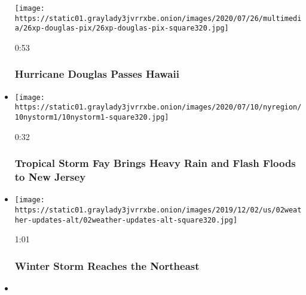 \begin{itemize}
  \texttt{[image: https://static01.graylady3jvrrxbe.onion/images/2020/07/26/multimedia/26xp-douglas-pix/26xp-douglas-pix-square320.jpg]}

  0:53

  \hypertarget{hurricane-douglas-passes-hawaii}{%
  \subsubsection{Hurricane Douglas Passes
  Hawaii}\label{hurricane-douglas-passes-hawaii}}
\item
  \href{https://www.nytimes3xbfgragh.onion/video/us/100000007233406/tropical-storm-fay-brings-heavy-rain-and-flash-floods-to-new-jersey.html?action=click\&module=video-series-bar\&region=header\&pgtype=Article\&playlistId=video/extreme-weather}{}

  \texttt{[image: https://static01.graylady3jvrrxbe.onion/images/2020/07/10/nyregion/10nystorm1/10nystorm1-square320.jpg]}

  0:32

  \hypertarget{tropical-storm-fay-brings-heavy-rain-and-flash-floods-to-new-jersey}{%
  \subsubsection{Tropical Storm Fay Brings Heavy Rain and Flash Floods
  to New
  Jersey}\label{tropical-storm-fay-brings-heavy-rain-and-flash-floods-to-new-jersey}}
\item
  \href{https://www.nytimes3xbfgragh.onion/video/us/100000006853962/winter-storm-northeast.html?action=click\&module=video-series-bar\&region=header\&pgtype=Article\&playlistId=video/extreme-weather}{}

  \texttt{[image: https://static01.graylady3jvrrxbe.onion/images/2019/12/02/us/02weather-updates-alt/02weather-updates-alt-square320.jpg]}

  1:01

  \hypertarget{winter-storm-reaches-the-northeast}{%
  \subsubsection{Winter Storm Reaches the
  Northeast}\label{winter-storm-reaches-the-northeast}}
\item
  \href{https://www.nytimes3xbfgragh.onion/video/us/100000006848528/thanksgiving-storms.html?action=click\&module=video-series-bar\&region=header\&pgtype=Article\&playlistId=video/extreme-weather}{}


\end{itemize}
